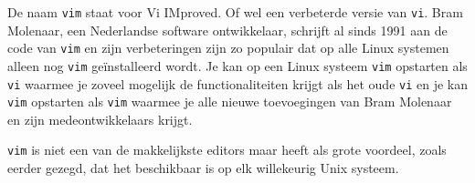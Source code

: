 De naam \texttt{vim} staat voor Vi IMproved. Of wel een verbeterde versie van \texttt{vi}. Bram Molenaar, een Nederlandse software ontwikkelaar, schrijft al sinds 1991 aan de code van \texttt{vim} en zijn verbeteringen zijn zo populair dat op alle Linux systemen alleen nog \texttt{vim} ge\"installeerd wordt. Je kan op een Linux systeem \texttt{vim} opstarten als \texttt{vi} waarmee je zoveel mogelijk de functionaliteiten krijgt als het oude \texttt{vi} en je kan \texttt{vim} opstarten als \texttt{vim} waarmee je alle nieuwe toevoegingen van Bram Molenaar en zijn medeontwikkelaars krijgt.

\texttt{vim} is niet een van de makkelijkste editors maar heeft als grote voordeel, zoals eerder gezegd, dat het beschikbaar is op elk willekeurig Unix systeem.
